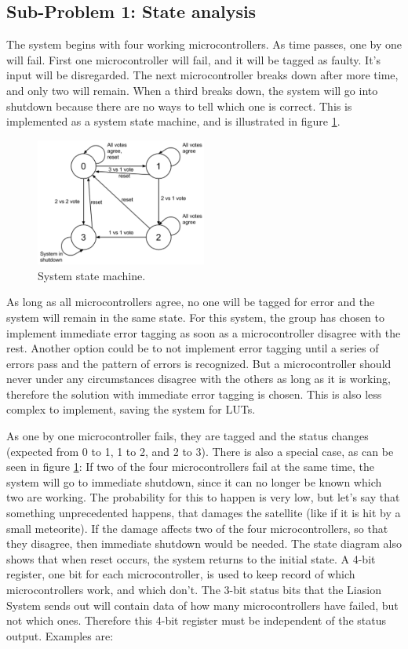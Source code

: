 \documentclass[a4paper]{IEEEtran}
\begin{document}
\subsection{Sub-Problem 1: State analysis}

The system begins with four working microcontrollers.
As time passes, one by one will fail.
First one microcontroller will fail, and it will be tagged as faulty.
It's input will be disregarded.
The next microcontroller breaks down after more time, and only two will remain.
When a third breaks down, the system will go into shutdown because there are no ways to tell which one is correct.
This is implemented as a system state machine, and is illustrated in figure \ref{fig:StateMachine}.
\begin{figure}[h!]
    \centering
    \includegraphics[width=0.5\textwidth]{Figures/Solution/StateMachine}
    \caption{System state machine.}
    \label{fig:StateMachine}
\end{figure}

As long as all microcontrollers agree, no one will be tagged for error and the system will remain in the same state.
For this system, the group has chosen to implement immediate error tagging as soon as a microcontroller disagree with the rest.
Another option could be to not implement error tagging until a series of errors pass and the pattern of errors is recognized.
But a microcontroller should never under any circumstances disagree with the others as long as it is working, therefore the solution with immediate error tagging is chosen.
This is also less complex to implement, saving the system for LUTs.

As one by one microcontroller fails, they are tagged and the status changes (expected from 0 to 1, 1 to 2, and 2 to 3).
There is also a special case, as can be seen in figure \ref{fig:StateMachine}:
If two of the four microcontrollers fail at the same time, the system will go to immediate shutdown, since it can no longer be known which two are working.
The probability for this to happen is very low, but let's say that something unprecedented happens, that damages the satellite (like if it is hit by a small meteorite).
If the damage affects two of the four microcontrollers, so that they disagree, then immediate shutdown would be needed.
The state diagram also shows that when reset occurs, the system returns to the initial state.
A 4-bit register, one bit for each microcontroller, is used to keep record of which microcontrollers work, and which don't.
The 3-bit status bits that the Liasion System sends out will contain data of how many microcontrollers have failed, but not which ones.
Therefore this 4-bit register must be independent of the status output.
Examples are:
\end{document}
